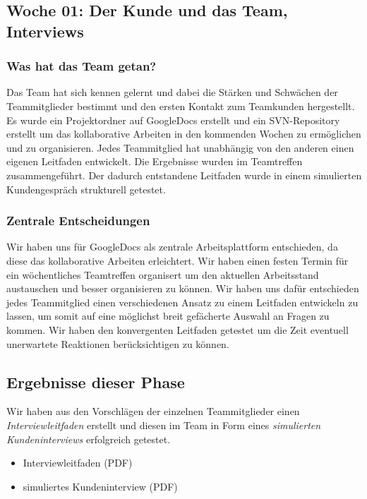\documentclass{article}
\begin{document}
\subsection{Woche 01: Der Kunde und das Team, Interviews}

\subsubsection{Was hat das Team getan?}

Das Team hat sich kennen gelernt und dabei die St\"arken und Schw\"achen der Teammitglieder bestimmt und den ersten Kontakt zum Teamkunden hergestellt. Es wurde ein Projektordner auf GoogleDocs erstellt und ein SVN-Repository erstellt um das kollaborative Arbeiten in den kommenden Wochen zu erm\"oglichen und zu organisieren. Jedes Teammitglied hat unabh\"angig von den anderen einen eigenen Leitfaden entwickelt. Die Ergebnisse wurden im Teamtreffen zusammengef\"uhrt. Der dadurch entstandene Leitfaden wurde in einem simulierten Kundengespr\"ach strukturell getestet.

\subsubsection{Zentrale Entscheidungen}

Wir haben uns f\"ur GoogleDocs als zentrale Arbeitsplattform entschieden, da diese das kollaborative Arbeiten erleichtert. Wir haben einen festen Termin f\"ur ein w\"ochentliches Teamtreffen organisert um den aktuellen Arbeitsstand austauschen und besser organisieren zu k\"onnen. Wir haben uns daf\"ur entschieden jedes Teammitglied einen verschiedenen Ansatz zu einem Leitfaden entwickeln zu lassen, um somit auf eine m\"oglichst breit gef\"acherte Auswahl an Fragen zu kommen. Wir haben den konvergenten Leitfaden getestet um die Zeit eventuell unerwartete Reaktionen ber\"ucksichtigen zu k\"onnen.

\subsection{Ergebnisse dieser Phase}

Wir haben aus den Vorschl\"agen der einzelnen Teammitglieder einen \textit{Interviewleitfaden} erstellt und diesen im Team in Form eines \textit{simulierten Kundeninterviews} erfolgreich getestet.

\begin{itemize}
\item Interviewleitfaden (PDF)
\item simuliertes Kundeninterview (PDF)
\end{itemize}
\end{document}
